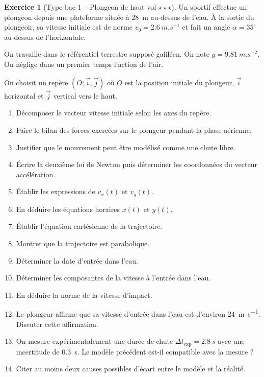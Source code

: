 \documentclass[11pt,a4paper]{article}
\theoremstyle{definition}
\newtheorem{exercice}{Exercice}[section]
\newcommand{\etoiles}[1]{\hfill{\small\textbf{#1}}}
\begin{document}
\begin{exercice}[Type bac 1 -- Plongeon de haut vol \etoiles{$\star\star\star$}]
Un sportif effectue un plongeon depuis une plateforme située à \SI{28}{m} au-dessus de l’eau.
À la sortie du plongeoir, sa vitesse initiale est de norme $v_0=\SI{2,6}{m.s^{-1}}$ et fait un angle
$\alpha=35^\circ$ au-dessus de l’horizontale.

On travaille dans le référentiel terrestre supposé galiléen. On note $g=\SI{9,81}{m.s^{-2}}$.
On néglige dans un premier temps l’action de l’air.

On choisit un repère $(O;\vec{i},\vec{j})$ où $O$ est la position initiale du plongeur, $\vec{i}$ horizontal
et $\vec{j}$ vertical vers le haut.

\begin{enumerate}[label=\arabic*.]
    \item Décomposer le vecteur vitesse initiale selon les axes du repère.
    \item Faire le bilan des forces exercées sur le plongeur pendant la phase aérienne.
    \item Justifier que le mouvement peut être modélisé comme une chute libre.
    \item Écrire la deuxième loi de Newton puis déterminer les coordonnées du vecteur accélération.
    \item Établir les expressions de $v_x(t)$ et $v_y(t)$.
    \item En déduire les équations horaires $x(t)$ et $y(t)$.
    \item Établir l’équation cartésienne de la trajectoire.
    \item Montrer que la trajectoire est parabolique.
    \item Déterminer la date d’entrée dans l’eau.
    \item Déterminer les composantes de la vitesse à l’entrée dans l’eau.
    \item En déduire la norme de la vitesse d’impact.
    \item Le plongeur affirme que sa vitesse d’entrée dans l’eau est d’environ \SI{24}{m.s^{-1}}.
    Discuter cette affirmation.
    \item On mesure expérimentalement une durée de chute $\Delta t_{\mathrm{exp}}=\SI{2,8}{s}$ avec une
    incertitude de \SI{0,3}{s}. Le modèle précédent est-il compatible avec la mesure ?
    \item Citer au moins deux causes possibles d’écart entre le modèle et la réalité.
\end{enumerate}
\end{exercice}
\end{document}
